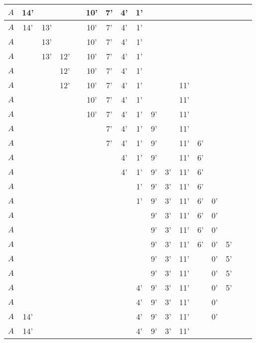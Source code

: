 \begin{center}
{\begin{tabular}{ | l | c | c | c | c | c | c | c | c | c | c | c | c | c | c | c | c | }
            $A$ & 14' & & & & 10' & 7' & 4' & 1' & & & & & & & \\ \hline \hline
            $A$ & 14' & 13' & & & 10' & 7' & 4' & 1' & & & & & & & \\ \hline
            $A$ & & 13' & & & 10' & 7' & 4' & 1' & & & & & & & \\ \hline 
            $A$ & & 13' & 12' & & 10' & 7' & 4' & 1' & & & & & & & \\ \hline
            $A$ & & & 12' & & 10' & 7' & 4' & 1' & & & & & & & \\ \hline
            $A$ & & & 12' & & 10' & 7' & 4' & 1' & & & 11' & & & & \\ \hline
            $A$ & & & & & 10' & 7' & 4' & 1' & & & 11' & & & & \\ \hline
            $A$ & & & & & 10' & 7' & 4' & 1' & 9' & & 11' & & & & \\ \hline
            $A$ & & & & & & 7' & 4' & 1' & 9' & & 11' & & & & \\ \hline
            $A$ & & & & & & 7' & 4' & 1' & 9' & & 11' & 6' & & & \\ \hline
            $A$ & & & & & & & 4' & 1' & 9' & & 11' & 6' & & & \\ \hline
            $A$ & & & & & & & 4' & 1' & 9' & 3' & 11' & 6' & & & \\ \hline
            $A$ & & & & & & & & 1' & 9' & 3' & 11' & 6' & & & \\ \hline
            $A$ & & & & & & & & 1' & 9' & 3' & 11' & 6' & 0' & & \\ \hline
            $A$ & & & & & & & & & 9' & 3' & 11' & 6' & 0' & & \\ \hline
            $A$ & & & & & & & & & 9' & 3' & 11' & 6' & 0' & & \\ \hline
            $A$ & & & & & & & & & 9' & 3' & 11' & 6' & 0' & 5' &\\ \hline
            $A$ & & & & & & & & & 9' & 3' & 11' & & 0' & 5' & \\ \hline \hline
            $A$ & & & & & & & & & 9' & 3' & 11' & & 0' & 5'  &\\ \hline
            $A$ & & & & & & & & 4' & 9' & 3' & 11' & & 0' & 5' & \\ \hline
            $A$ & & & & & & & & 4' & 9' & 3' & 11' & & 0' & &  \\ \hline
            $A$ & 14' & & & & & & & 4' & 9' & 3' & 11' & & 0' & & \\ \hline
            $A$ & 14' & & & & & & & 4' & 9' & 3' & 11' & & & & \\ \hline

\end{tabular}}
\end{center}
